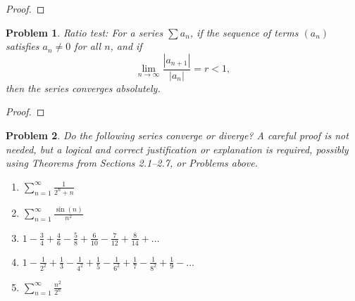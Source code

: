 \documentclass[12pt]{article}
\newtheorem{problem}{Problem}
\begin{document}
\begin{proof}
\end{proof}


\begin{problem} %
Ratio test:  For a series $\sum a_n$, if the sequence of terms $(a_n)$ satisfies $a_n\ne 0$ for all $n$, and if
	$$\lim_{n\to\infty} \frac{|a_{n+1}|}{|a_n|} = r < 1,$$
then the series converges absolutely.
\end{problem}


\begin{proof}
\end{proof}


\begin{problem} %
Do the following series converge or diverge?  A careful proof is not needed, but a logical and correct justification or explanation is required, possibly using Theorems from Sections 2.1--2.7, or Problems above.

\renewcommand{\labelenumi}{(\alph{enumi})}
\begin{enumerate}
\item $\sum_{n=1}^\infty \frac{1}{2^n+n}$


\item $\sum_{n=1}^\infty \frac{\sin(n)}{n^2}$


\item $1 - \frac{3}{4} + \frac{4}{6} - \frac{5}{8} + \frac{6}{10} - \frac{7}{12} + \frac{8}{14} + \dots$


\item $1 - \frac{1}{2^2} + \frac{1}{3} - \frac{1}{4^2} + \frac{1}{5} - \frac{1}{6^2} + \frac{1}{7} - \frac{1}{8^2} + \frac{1}{9} - \dots$


\item $\sum_{n=1}^\infty \frac{n^2}{2^n}$


\end{enumerate}
\end{problem}
\end{document}
